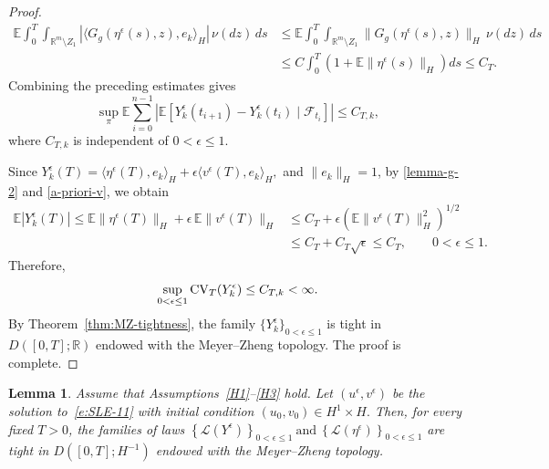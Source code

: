 \documentclass[11pt]{article}
\theoremstyle{plain}
\newtheorem{lemma}[theorem]{Lemma}
\numberwithin{equation}{section}
\begin{document}
\begin{proof}
\[
\begin{aligned}
\mathbb E\int_0^T \int_{\mathbb R^m\setminus Z_1}|\langle G_g(\eta^\epsilon(s),z),e_k\rangle_H|\,\nu(dz)\,ds                                          
&\le\mathbb E\int_0^T\int_{\mathbb R^m\setminus Z_1}\|G_g(\eta^\epsilon(s),z)\|_H\,\nu(dz)\,ds              \\
&\le C\int_0^T\left(1+\mathbb E\|\eta^\epsilon(s)\|_H\right)ds \le C_T .
\end{aligned}
\]
Combining the preceding estimates gives
\[
\sup_{\pi}\mathbb E\sum_{i=0}^{n-1}\left|\mathbb E\left[ Y_k^\epsilon(t_{i+1})-Y_k^\epsilon(t_i)\mid \mathcal F_{t_i}\right]\right|\le C_{T,k},
\]
where \(C_{T,k}\) is independent of \(0<\epsilon\le1\).

Since \(Y_k^\epsilon(T)=\langle \eta^\epsilon(T),e_k\rangle_H+\epsilon\langle v^\epsilon(T),e_k\rangle_H ,\)
and \(\|e_k\|_H=1\),  by \eqref{lemma-g-2} and \eqref{a-priori-v}, we obtain
\[
\begin{aligned}
\mathbb E|Y_k^\epsilon(T)| \le \mathbb E\|\eta^\epsilon(T)\|_H+ \epsilon\,\mathbb E\|v^\epsilon(T)\|_H            
&\le C_T+\epsilon\left(\mathbb E\|v^\epsilon(T)\|_H^2\right)^{1/2}               \\
&\le C_T+C_T\sqrt{\epsilon}\le C_T , \qquad 0<\epsilon\le1 .
\end{aligned}
\]
Therefore,
\[
\sup_{0<\epsilon\le1}{\rm CV}_{T}(Y_k^\epsilon) \le C_{T,k}<\infty .
\]
By Theorem~\ref{thm:MZ-tightness}, the family \(\{Y_k^\epsilon\}_{0<\epsilon\le1}\) is tight in  \(D([0,T];\mathbb R)\) endowed with the Meyer--Zheng topology.
The proof is complete.
\end{proof}



\begin{lemma}\label{thm:main3}
Assume that Assumptions~\ref{H1}--\ref{H3} hold. Let \((u^\epsilon,v^\epsilon)\) be the solution to~\eqref{e:SLE-11} with
initial condition \((u_0,v_0)\in H^1\times H .\) Then, for every fixed \(T>0\), the families of laws
\(\left\{\mathcal L(Y^\epsilon)\right\}_{0<\epsilon\le1} ~\text{and}~ \left\{\mathcal L(\eta^\epsilon)\right\}_{0<\epsilon\le1}\)
are tight in \(D([0,T];H^{-1})\) endowed with the Meyer--Zheng topology.
\end{lemma}
\end{document}
